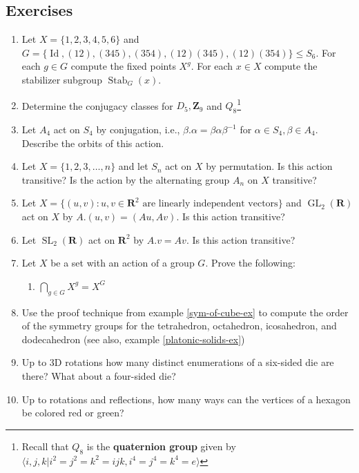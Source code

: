 \documentclass[12pt]{article}
\numberwithin{equation}{subsection}
\theoremstyle{note}
\newcommand{\GL}{\operatorname{GL}}
\newcommand{\SL}{\operatorname{SL}}
\newcommand{\SO}{\operatorname{SO}}
\newcommand{\Id}{\operatorname{Id}}
\newcommand{\Stab}{\operatorname{Stab}}
\begin{document}
\subsection{Exercises}
\begin{enumerate}[label=\arabic*.]
	\item Let $X=\{1,2,3,4,5,6\}$ and $G=\{ \Id, (12), (345), (354), (12)(345), (12)(354)\}\leq S_6$. For each $g\in G$ compute the fixed points $X^g$. For each $x\in X$ compute the stabilizer subgroup $\Stab_G(x)$.
	\item Determine the conjugacy classes for $D_5, \mathbf{Z}_9$ and $Q_8$\footnote{Recall that $Q_8$ is the \textbf{quaternion group} given by $\langle i,j,k | i^2=j^2=k^2=ijk, i^4=j^4=k^4=e\rangle$}
	\item Let $A_4$ act on $S_4$ by conjugation, i.e., $\beta.\alpha=\beta \alpha \beta^{-1}$ for $\alpha\in S_4, \beta\in A_4$. Describe the orbits of this action. 
	\item Let $X=\{1,2,3,\dots,n\}$ and let $S_n$ act on $X$ by permutation. Is this action transitive? Is the action by the alternating group $A_n$ on $X$ transitive? 
	\item Let $X=\{(u,v): u,v\in \mathbf{R}^2 \text{ are linearly independent vectors}\}$ and $\GL_2(\mathbf{R})$ act on $X$ by $A.(u,v)=(Au,Av)$. Is this action transitive? 
	\item Let $\SL_2(\mathbf{R})$ act on $\mathbf{R}^2$ by $A.v=Av$. Is this action transitive? 
	\item Let $X$ be a set with an action of a group $G$. Prove the following:
	\begin{enumerate}
		\item $\bigcap_{g\in G}X^g=X^G$
	\end{enumerate}
	\item Use the proof technique from example \ref{sym-of-cube-ex} to compute the order of the symmetry groups for the tetrahedron, octahedron, icosahedron, and dodecahedron (see also, example \ref{platonic-solids-ex})
	\item Up to 3D rotations how many distinct enumerations of a six-sided die are there? What about a four-sided die?
	\item Up to rotations and reflections, how many ways can the vertices of a hexagon be colored red or green?

\end{enumerate}
\end{document}

